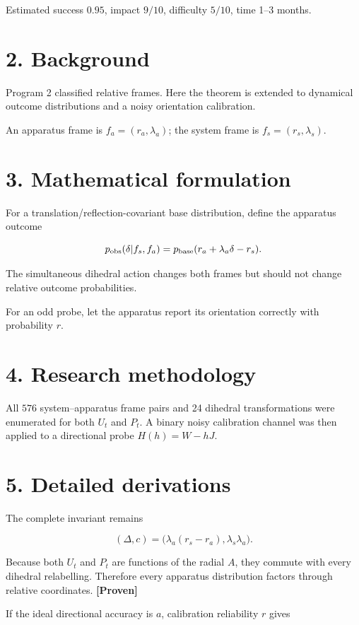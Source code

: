 \documentclass[11pt,a4paper,openany]{report}
\newcommand{\statusProven}{\textcolor{fingreen}{[Proven]}}
\begin{document}
Estimated success \(0.95\), impact \(9/10\), difficulty \(5/10\), time 1–3 months.

\section{2. Background}

Program 2 classified relative frames. Here the theorem is extended to dynamical outcome distributions and a noisy orientation calibration.

An apparatus frame is \(f_a=(r_a,\lambda_a)\); the system frame is \(f_s=(r_s,\lambda_s)\).

\section{3. Mathematical formulation}

For a translation/\allowbreak{}reflection-covariant base distribution, define the apparatus outcome

\[
p_{\rm obs}(\delta|f_s,f_a)
=p_{\rm base}(r_a+\lambda_a\delta-r_s).
\]

The simultaneous dihedral action changes both frames but should not change relative outcome probabilities.

For an odd probe, let the apparatus report its orientation correctly with probability \(r\).

\section{4. Research methodology}

All \(576\) system–apparatus frame pairs and 24 dihedral transformations were enumerated for both \(U_t\) and \(P_t\). A binary noisy calibration channel was then applied to a directional probe \(H(h)=W-hJ\).

\section{5. Detailed derivations}

The complete invariant remains

\[
(\Delta,c)
=\bigl(\lambda_a(r_s-r_a),\lambda_s\lambda_a\bigr).
\]

Because both \(U_t\) and \(P_t\) are functions of the radial \(A\), they commute with every dihedral relabelling. Therefore every apparatus distribution factors through relative coordinates. \textbf{\statusProven{}}

If the ideal directional accuracy is \(a\), calibration reliability \(r\) gives
\end{document}

